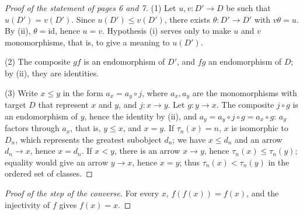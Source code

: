 \documentclass[11pt]{article}
\theoremstyle{plain}
\theoremstyle{definition}
\theoremstyle{remark}
\begin{document}
\begin{proof}[Proof of the statement of pages 6 and 7]
(1) Let $u, v : D' \to D$ be such that $u(D') = v(D')$. Since $u(D') \leq v(D')$, there exists $\theta : D' \to D'$ with $v\theta = u$. By (ii), $\theta = \mathrm{id}$, hence $u = v$. Hypothesis (i) serves only to make $u$ and $v$ monomorphisms, that is, to give a meaning to $u(D')$.

(2) The composite $gf$ is an endomorphism of $D'$, and $fg$ an endomorphism of $D$; by (ii), they are identities.

(3) Write $x \leq y$ in the form $a_x = a_y \circ j$, where $a_x, a_y$ are the monomorphisms with target $D$ that represent $x$ and $y$, and $j : x \to y$. Let $g : y \to x$. The composite $j \circ g$ is an endomorphism of $y$, hence the identity by (ii), and $a_y = a_y \circ j \circ g = a_x \circ g$: $a_y$ factors through $a_x$, that is, $y \leq x$, and $x = y$. If $\tau_n(x) = n$, $x$ is isomorphic to $D_n$, which represents the greatest subobject $d_n$; we have $x \leq d_n$ and an arrow $d_n \to x$, hence $x = d_n$. If $x < y$, there is an arrow $x \to y$, hence $\tau_n(x) \leq \tau_n(y)$; equality would give an arrow $y \to x$, hence $x = y$; thus $\tau_n(x) < \tau_n(y)$ in the ordered set of classes.
\end{proof}

\begin{proof}[Proof of the step of the converse]
For every $x$, $f(f(x)) = f(x)$, and the injectivity of $f$ gives $f(x) = x$.
\end{proof}
\end{document}
